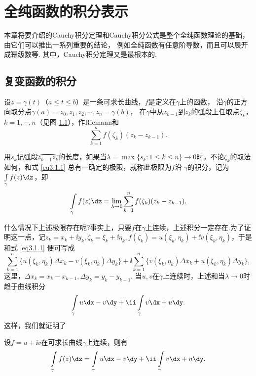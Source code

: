 \chapter{全纯函数的积分表示\label{chap3}}

本章将要介绍的Cauchy积分定理和Cauchy积分公式是整个全纯函数理论的基础，由它们可以推出一系列重要的结论，
例如全纯函数有任意阶导数，而且可以展开成幂级数等. 其中，Cauchy积分定理又是最根本的.


\section{复变函数的积分\label{sec3.1}}

设$z=\gamma(t)$（$a\le t\le b$）是一条可求长曲线，$f$是定义在$\gamma$上的函数，
沿$\gamma$的正方向取分点$\gamma(a)=z_0,z_1,z_2,\cdots,z_n=\gamma(b)$，
在$\gamma$中从$z_{k-1}$到$z_k$的弧段上任取点$\zeta_k$， $k=1,\cdots,n$（见图 \ref{fig3.1}），作Riemann和
\begin{equation}\label{eq3.1.1}
\sum_{k=1}^nf(\zeta_k)(z_k-z_{k-1}).
\end{equation}
\begin{figure}[!ht]
\centering
{}
\caption{\label{fig3.1}}
\end{figure}
用$s_k$记弧段$\wideparen{z_{k-1}z_k}$的长度，如果当$\lambda=\max\{s_k:1\le k\le n\}\to0$时，不论$\zeta_k$的取法如何，和式 \eqref{eq3.1.1} 总有一确定的极限，就称此极限为$f$沿
$\gamma$的积分，记为$\int\limits_\gamma f(z)\dz$，即
\[\int\limits_\gamma f(z)\dz=\lim_{\lambda\to0}\sum_{k=1}^nf(\zeta_k)(z_k-z_{k-1}).\]

什么情况下上述极限存在呢?事实上，只要$f$在$\gamma$上连续，上述积分一定存在.为了证明这一点，记$z_k=x_k+\ii y_k,\zeta_k=\xi_k+\ii\eta_k,f(\zeta_k)=u(\xi_k,\eta_k)+\ii v(\xi_k,\eta_k)$，于是和式 \eqref{eq3.1.1} 便可写成
\[\sum_{k=1}^n\{u(\xi_k,\eta_k)\Delta x_k-v(\xi_k,\eta_k)\Delta y_k\}
+\ii\sum_{k=1}^n\{v(\xi_k,\eta_k)\Delta x_k+u(\xi_k,\eta_k)\Delta y_k\},\]
这里，$\Delta x_k=x_k-x_{k-1},\Delta y_k=y_k-y_{k-1}$. 当$u,v$在$\gamma$上连续时，上述和当$\lambda\to0$时趋于曲线积分
\[\int\limits_\gamma u\dx-v\dy+\ii\int\limits_\gamma v\dx+u\dy.\]
这样，我们就证明了
\begin{prop}\label{prop3.1.1}
设$f=u+\ii v$在可求长曲线$\gamma$上连续，则有
\begin{equation}\label{eq3.1.2}
\int\limits_\gamma f(z)\dz=\int\limits\limits_\gamma u\dx-v\dy+\ii\int\limits_\gamma v\dx+u\dy.
\end{equation}
\end{prop}


